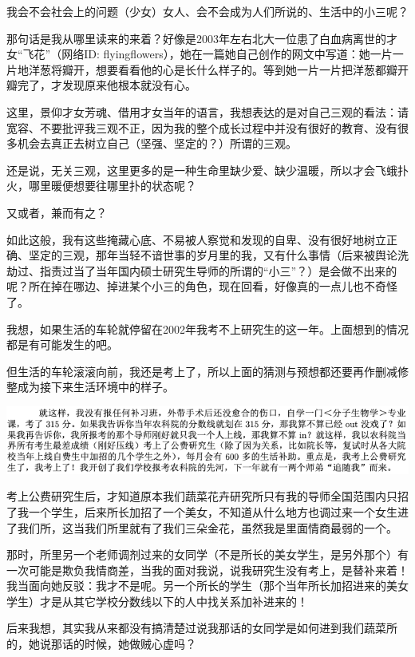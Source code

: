 \documentclass[9pt, b5paper]{article}
\begin{document}
我会不会社会上的问题（少女）女人、会不会成为人们所说的、生活中的小三呢？

那句话是我从哪里读来的来着？好像是2003年左右北大一位患了白血病离世的才女“飞花”（网络ID: flyingflowers），她在一篇她自己创作的网文中写道：她一片一片地洋葱将瓣开，想要看看他的心是长什么样子的。等到她一片一片把洋葱都瓣开瓣完了，才发现原来他根本就没有心。

这里，景仰才女芳魂、借用才女当年的语言，我想表达的是对自己三观的看法：请宽容、不要批评我三观不正，因为我的整个成长过程中并没有很好的教育、没有很多机会去真正去树立自己（坚强、坚定的？）所谓的三观。

还是说，无关三观，这里更多的是一种生命里缺少爱、缺少温暖，所以才会飞蛾扑火，哪里暖便想要往哪里扑的状态呢？

又或者，兼而有之？

如此这般，我有这些掩藏心底、不易被人察觉和发现的自卑、没有很好地树立正确、坚定的三观，那年当轻不谙世事的岁月里的我，又有什么事情（后来被舆论洗劫过、指责过当了当年国内硕士研究生导师的所谓的“小三”？）是会做不出来的呢？所在掉在哪边、掉进某个小三的角色，现在回看，好像真的一点儿也不奇怪了。

我想，如果生活的车轮就停留在2002年我考不上研究生的这一年。上面想到的情况都是有可能发生的吧。

但生活的车轮滚滚向前，我还是考上了，所以上面的猜测与预想都还要再作删减修整成为接下来生活环境中的样子。

\begin{center}
\includegraphics[width=.9\linewidth]{./pic/backups_plans_20210422_095512.png}
\end{center}

考上公费研究生后，才知道原本我们蔬菜花卉研究所只有我的导师全国范围内只招了我一个学生，后来所长加招了一个美女，不知道从什么地方也调过来一个女生进了我们所，这当我们所里就有了我们三朵金花，虽然我是里面情商最弱的一个。

那时，所里另一个老师调剂过来的女同学（不是所长的美女学生，是另外那个）有一次可能是欺负我情商差，当我的面对我说，说我研究生没有考上，是替补来着！我当面向她反驳：我才不是呢。另一个所长的学生（那个当年所长加招进来的美女学生）才是从其它学校分数线以下的人中找关系加补进来的！

后来我想，其实我从来都没有搞清楚过说我那话的女同学是如何进到我们蔬菜所的，她说那话的时候，她做贼心虚吗？
\end{document}
